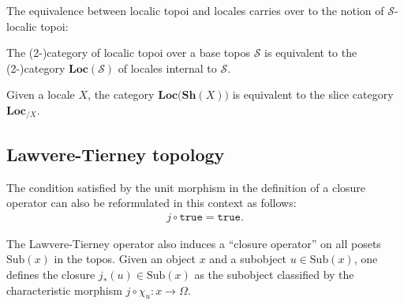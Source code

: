     The equivalence between localic topoi and locales carries over to the notion of $\mathcal{S}$-localic topoi:
    \begin{property}
        The (2-)category of localic topoi over a base topos $\mathcal{S}$ is equivalent to the (2-)category $\mathbf{Loc}(\mathcal{S})$ of locales internal to $\mathcal{S}$.
    \end{property}
    \begin{property}\label{topos:slice_locale}
        Given a locale $X$, the category $\mathbf{Loc}\big(\mathbf{Sh}(X)\big)$ is equivalent to the slice category $\mathbf{Loc}_{/X}$.
    \end{property}

\subsection{Lawvere-Tierney topology}

    \begin{remark}
        The condition satisfied by the unit morphism in the definition of a closure operator can also be reformulated in this context as follows:
        \begin{gather}
            j\circ\texttt{true} = \texttt{true}.
        \end{gather}
    \end{remark}
    The Lawvere-Tierney operator also induces a ``closure operator'' on all posets $\mathrm{Sub}(x)$ in the topos. Given an object $x$ and a subobject $u\in\text{Sub}(x)$, one defines the closure $j_\ast(u)\in\text{Sub}(x)$ as the subobject classified by the characteristic morphism $j\circ\chi_u:x\rightarrow\Omega$.

